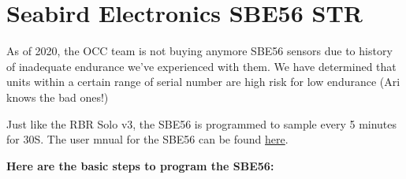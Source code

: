 \documentclass[]{book}
\begin{document}
\hypertarget{sbe56}{%
\section{Seabird Electronics SBE56 STR}\label{sbe56}}

As of 2020, the OCC team is not buying anymore SBE56 sensors due to history of inadequate endurance we've experienced with them. We have determined that units within a certain range of serial number are high risk for low endurance (Ari knows the bad ones!)

Just like the RBR Solo v3, the SBE56 is programmed to sample every 5 minutes for 30S. The user mnual for the SBE56 can be found \href{https://drive.google.com/drive/folders/1ujFmH1pJ704ikrsc11Ji2eNeuIBQ5JMa}{here}.

\textbf{Here are the basic steps to program the SBE56:}
\end{document}
